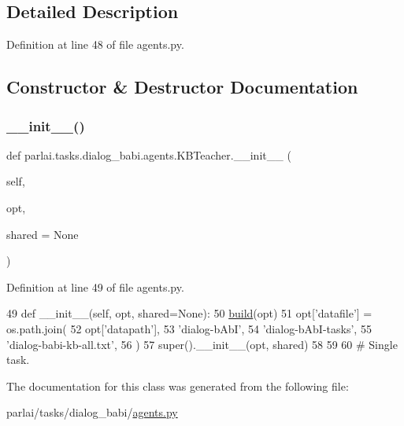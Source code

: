 \subsection{Detailed Description}


Definition at line 48 of file agents.\+py.



\subsection{Constructor \& Destructor Documentation}
\mbox{\label{classparlai_1_1tasks_1_1dialog__babi_1_1agents_1_1KBTeacher_ac822ca7f017823413af0eebd531bee41}} 
\subsubsection{\texorpdfstring{\+\_\+\+\_\+init\+\_\+\+\_\+()}{\_\_init\_\_()}}
{\footnotesize\ttfamily def parlai.\+tasks.\+dialog\+\_\+babi.\+agents.\+K\+B\+Teacher.\+\_\+\+\_\+init\+\_\+\+\_\+ (\begin{DoxyParamCaption}\item[{}]{self,  }\item[{}]{opt,  }\item[{}]{shared = {\ttfamily None} }\end{DoxyParamCaption})}



Definition at line 49 of file agents.\+py.


\begin{DoxyCode}
49     \textcolor{keyword}{def }\_\_init\_\_(self, opt, shared=None):
50         \hyperlink{namespaceparlai_1_1mturk_1_1tasks_1_1talkthewalk_1_1download_a8c0fbb9b6dfe127cb8c1bd6e7c4e33fd}{build}(opt)
51         opt[\textcolor{stringliteral}{'datafile'}] = os.path.join(
52             opt[\textcolor{stringliteral}{'datapath'}],
53             \textcolor{stringliteral}{'dialog-bAbI'},
54             \textcolor{stringliteral}{'dialog-bAbI-tasks'},
55             \textcolor{stringliteral}{'dialog-babi-kb-all.txt'},
56         )
57         super().\_\_init\_\_(opt, shared)
58 
59 
60 \textcolor{comment}{# Single task.}
\end{DoxyCode}


The documentation for this class was generated from the following file\+:\begin{DoxyCompactItemize}
\item 
parlai/tasks/dialog\+\_\+babi/\hyperlink{parlai_2tasks_2dialog__babi_2agents_8py}{agents.\+py}\end{DoxyCompactItemize}
